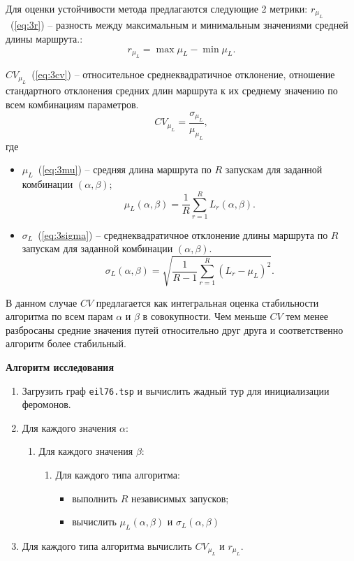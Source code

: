 Для оценки устойчивости метода предлагаются следующие 2 метрики:
$r_{\mu_{L}}$~(\ref{eq:3r}) -- разность между максимальным и минимальным значениями средней длины маршрута.:
\begin{equation}
r_{\mu_{L}} = \max \mu_{L} - \min \mu_{L}.
\label{eq:3r}
\end{equation}

$CV_{\mu_{L}}$~(\ref{eq:3cv}) -- относительное среднеквадратичное отклонение, отношение стандартного отклонения средних длин маршрута к их среднему значению по всем комбинациям параметров.
\begin{equation}
CV_{\mu_{L}} = \frac{\sigma_{\mu_{L}}}{\mu_{\mu_{L}}},
\label{eq:3cv}
\end{equation}
где
\begin{itemize}
	\item $\mu_{L}$~(\ref{eq:3mu}) -- средняя длина маршрута по $R$ запускам для заданной комбинации $(\alpha, \beta)$;
	\begin{equation}
		\mu_{L}(\alpha, \beta) = \frac{1}{R} \sum_{r=1}^{R} L_r(\alpha, \beta).
		\label{eq:3mu}
	\end{equation}
	
	\item $\sigma_{L}$~(\ref{eq:3sigma}) -- среднеквадратичное отклонение длины маршрута по $R$ запускам для заданной комбинации $(\alpha, \beta)$.
	\begin{equation}
		\sigma_{L}(\alpha, \beta) = \sqrt{\frac{1}{R-1} \sum_{r=1}^{R} (L_r - \mu_{L})^2}.
		\label{eq:3sigma}
	\end{equation}
\end{itemize}

В данном случае $CV$ предлагается как интегральная оценка стабильности алгоритма по всем парам $\alpha$ и $\beta$ в совокупности. Чем меньше $CV$ тем менее разбросаны средние значения путей относительно друг друга и соответственно алгоритм более стабильный.

\textbf{Алгоритм исследования}

\begin{enumerate}
	\item Загрузить граф \texttt{eil76.tsp} и вычислить жадный тур для инициализации феромонов.
	\item Для каждого значения $\alpha$:
	\begin{enumerate}
		\item Для каждого значения $\beta$:
		\begin{enumerate}
			\item Для каждого типа алгоритма:
			\begin{itemize}
				\item выполнить $R$ независимых запусков;
				\item вычислить $\mu_{L}(\alpha, \beta)$ и $\sigma_{L}(\alpha, \beta)$
			\end{itemize}
		\end{enumerate}
	\end{enumerate}
	\item Для каждого типа алгоритма вычислить $CV_{\mu_{L}}$ и $r_{\mu_{L}}$.
\end{enumerate}


